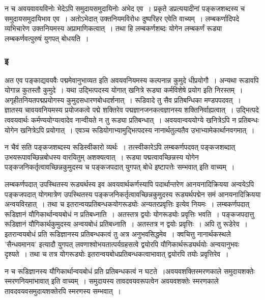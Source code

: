 			न च अवयवावयविनोः भेदेऽपि समुदायसमुदायिनोः अभेद एव~। प्रकृते डप्रत्ययादीनां पङ्कजशब्दस्य च समुदायसमुदायिभाव एव~। अतोऽभेदात् उक्तनियमविरोधः दुष्परिहर एवेति वाच्यम्~। लम्बकर्णादिपदे व्यभिचारेण उक्तनियमस्य अप्रामाणिकत्वात्~। तथा हि लम्बकर्णशब्दः योगेन लम्बकर्णं रूड्या लम्बकर्णवत्पुरुषं युगपत् बोधयति~।

			
			\subsubsection{इ}

				\begin{small}
				
					अत एव पङ्काद्यवयवैः पद्ममेवानुभाव्यत इति अवयवनियमस्य कल्पनान्न कुमुदे धीप्रयोगौ~। अन्यथा रूडावपि योगान्न कुतस्तौ कुमुदे~। यथा उद्भित्पदस्य योगात् खनित्रे रूड्या कर्मविशेषे प्रयोग इति निरस्तम्~। अगृहीतनियतपद्मप्रयोगस्य कुमुदसधारणबोधदर्शनात्~। रूडिवादे तु सैव प्रतिबन्धिका मण्डपपदवत्~। ज्ञातस्य चावयवनियमस्य प्रयोजकत्वे पद्मे शक्तिरेव पद्मज्ञानजनकत्वज्ञानस्य शक्तिनिर्वाह्यत्वात्~। उद्भित्पदे त्ववयवार्थः कर्मण्ययोग्यत्वादेव नान्वीयते न तु रूड्या प्रतिबन्धात्~। अवयवान्वययोग्ये  खनित्रेऽपि न प्रतिबन्धः योगेन खनित्रेऽपि प्रयोगात्~। एवञ्च रूडियोगाभ्यामुद्भित्पदस्य नानार्थतुल्यतैव  उभाभ्यामेकार्थानवगमात्~। 
				\end{small}
				
				न चैवं सति पङ्कजशब्दस्य रूडिस्वीकारो व्यर्थः~। तत्स्वीकारेऽपि लम्बकर्णपदवत्  पङ्कजशब्दात् उभयरूपावच्छिन्नबोधस्य वारयितुम् अशक्यत्वात्~। रूड्या पद्मत्वावच्छिन्नस्य योगेन पङ्कजनिकर्तृत्वावच्छिन्नकुमुदस्य च पङ्कजपदात्  युगपत् बोधे इष्टापत्तेः सम्भवात् इति वाच्यम्~।
 
				लम्बकर्णपदात् उपस्थितस्य रूड्यर्थस्य इव अवयवार्थकर्णस्यापि पदार्थान्तरेण आनयनादिक्रियया  अन्वयेऽपि  पङ्कजपदात् योगमात्रेण उपस्थितस्य पङ्कजनिकर्तृत्वावच्छिन्नकुमुदस्य रूड्यर्थपद्मेन समं आनयनादिक्रियया  अन्वयविरहात्~। तथा च इतरान्वयप्रतिबन्धकयोगरूड्योः अन्यतरप्रवृत्तिः इत्येव नियमः~। लम्बकर्णपदात् रूडिज्ञानं यौगिकार्थान्वयबोधं न प्रतिबध्नाति~। अतस्तत्र द्वयोः योगरूड्योः प्रवृत्तिः भवति~। पङ्कजपदात्तु  रूडिज्ञानं  यौगिकार्थकुमुदस्य अन्वयबोधं प्रतिबध्नाति~। अतस्तत्र न द्वयोः प्रवृत्तिः~। अपि तु रूडेरेव~। इतरान्वयबोधं प्रति रूडिज्ञानस्य प्रतिबन्धकत्वं तु अत्र अनुभवसिद्धमेव~। क्वचित्तु नानार्थकस्थले  ’सैन्धवमानय’ इत्यादौ युगपत् लवणाश्वोभयतात्पर्यग्रहसत्वे द्वयोरपि यौगिकार्थरूड्यर्थयोः अन्वयानुभवः दृश्यते~। तथा च तत्र योगरूड्योः इतरान्वयबोधप्रतिबन्धकत्वाभावात् द्वयोरपि तयोः प्रवृत्तिरेव~।

				न च रूडिज्ञानस्य यौगिकार्थान्वयबोधं प्रति प्रतिबन्धकत्वं न घटते~।अवयवशक्तिस्मरणकाले समुदायशक्तेः स्मरणनियमाभावात् इति वाच्यम्~। समुदायस्य तावदवयवरूपत्वेन अवयवशक्तेः स्मरणकाले  तावदवयवसमुदायशक्तेरपि स्मरणस्य सम्भवात्~।

